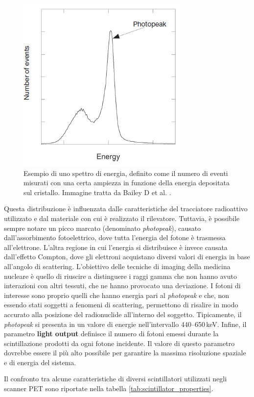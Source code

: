 \begin{figure}[tbh]
	\centering
	\includegraphics[width=0.35\linewidth]{./ImageFiles/Photo peak.jpg}
	\caption{Esempio di uno spettro di energia, definito come il numero di eventi misurati con una certa ampiezza in funzione della energia depositata sul cristallo. Immagine tratta da Bailey D et al. \cite{Bailey2014}.}
	\label{fig:photo_peak}
\end{figure}
Questa distribuzione è influenzata dalle caratteristiche del tracciatore radioattivo utilizzato e dal materiale con cui è realizzato il rilevatore. Tuttavia, è possibile sempre notare un picco marcato (denominato \textit{photopeak}), causato dall'assorbimento fotoelettrico, dove tutta l'energia del fotone è trasmessa all'elettrone. L'altra regione in cui l'energia si distribuisce è invece causata dall'effetto Compton, dove gli elettroni acquistano diversi valori di energia in base all'angolo di scattering. L'obiettivo delle tecniche di imaging della medicina nucleare è quello di riuscire a distinguere i raggi gamma che non hanno avuto interazioni con altri tessuti, che ne hanno provocato una deviazione. I fotoni di interesse sono proprio quelli che hanno energia pari al \textit{photopeak} e che, non essendo stati soggetti a fenomeni di scattering, permettono di risalire in modo accurato alla posizione del radionuclide all'interno del soggetto. Tipicamente, il \textit{photopeak} si presenta in un valore di energie nell'intervallo \numrange[range-phrase=--]{440}{650}\,\unit{\kilo\electronvolt}. Infine, il parametro \textbf{light output} definisce il numero di fotoni emessi durante la scintillazione prodotti da ogni fotone incidente. Il valore di questo parametro dovrebbe essere il più alto possibile per garantire la massima risoluzione spaziale e di energia del sistema.

\noindent
Il confronto tra alcune caratteristiche di diversi scintillatori utilizzati negli scanner PET sono riportate nella tabella \ref{tab:scintillator_properties}.

